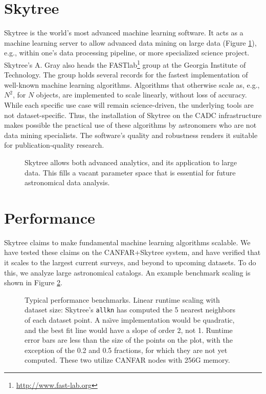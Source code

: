 \section{Skytree} \label{Sec: Skytree}

Skytree is the world's most advanced machine learning software. It acts as a machine learning server to allow advanced data mining on large data (Figure \ref{Fig: Skytree}), e.g., within one's data processing pipeline, or more specialized science project. Skytree's A. Gray also heads the FASTlab\footnote{\url{http://www.fast-lab.org}} group at the Georgia Institute of Technology. The group holds several records for the fastest implementation of well-known machine learning algorithms. Algorithms that otherwise scale as, e.g., $N^2$, for $N$ objects, are implemented to scale linearly, without loss of accuracy. While each specific use case will remain science-driven, the underlying tools are not dataset-specific. Thus, the installation of Skytree on the CADC infrastructure makes possible the practical use of these algorithms by astronomers who are not data mining specialists. The software's quality and robustness renders it suitable for publication-quality research.

\begin{figure}
\caption{Skytree allows both advanced analytics, and its application to large data. This fills a vacant parameter space that is essential for future astronomical data analysis. \label{Fig: Skytree}}
\end{figure}

\section{Performance} \label{Sec: Performance}

Skytree claims to make fundamental machine learning algorithms scalable. We have tested these claims on the CANFAR+Skytree system, and have verified that it scales to the largest current surveys, and beyond to upcoming datasets. To do this, we analyze large astronomical catalogs. An example benchmark scaling is shown in Figure \ref{Fig: runtime}.

\begin{figure}
\caption{Typical performance benchmarks. Linear runtime scaling with dataset size: Skytree's {\tt allkn} has computed the 5 nearest neighbors of each dataset point. A na\"{\i}ve implementation would be quadratic, and the best fit line would have a slope of order 2, not 1. Runtime error bars are less than the size of the points on the plot, with the exception of the 0.2 and 0.5 fractions, for which they are not yet computed. These two utilize CANFAR nodes with 256G memory. \label{Fig: runtime}}
\end{figure}

